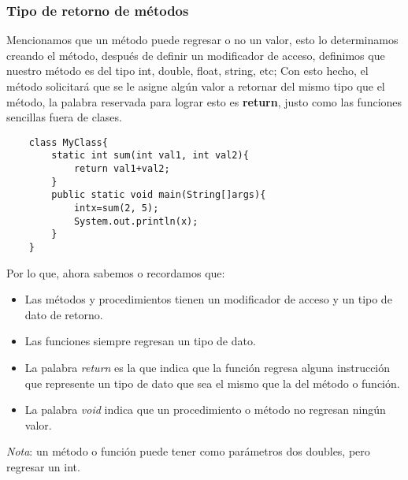 \subsubsection{Tipo de retorno de métodos}
Mencionamos que un método puede regresar o no un valor, esto lo determinamos creando el método, después de definir un modificador de acceso, definimos que nuestro método es del tipo int, double, float, string, etc;
Con esto hecho, el método solicitará que se le asigne algún valor a retornar del mismo tipo que el método, la palabra reservada para lograr esto es \textbf{return}, justo como las funciones sencillas fuera de clases.
\begin{lstlisting}
    class MyClass{
        static int sum(int val1, int val2){
            return val1+val2;
        }
        public static void main(String[]args){
            intx=sum(2, 5);
            System.out.println(x);
        }
    }
\end{lstlisting}
Por lo que, ahora sabemos o recordamos que:
\begin{itemize}
    \item Las métodos y procedimientos tienen un modificador de acceso y un tipo de dato de retorno.
    \item Las funciones siempre regresan un tipo de dato.
    \item La palabra \textit{return} es la que indica que la función regresa alguna instrucción que represente un tipo de dato que sea el mismo que la del método o función.
    \item La palabra \textit{void} indica que un procedimiento o método no regresan ningún valor.
\end{itemize}
\textit{Nota}: un método o función puede tener como parámetros dos doubles, pero regresar un int.

